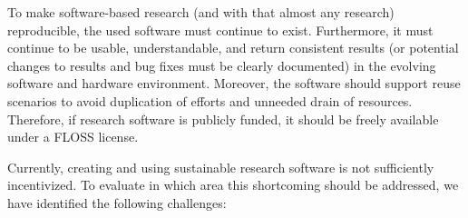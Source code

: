 \documentclass[a4paper,num-refs,numbers,sort&compress]{de-rse}
\begin{document}
To make software-based research (and with that almost any research)
reproducible, the used software must continue to exist. Furthermore, it must
continue to be usable, understandable, and return
consistent results (or potential changes to results and bug fixes must be clearly documented) in the
evolving software and hardware environment. Moreover, the software
should support reuse scenarios to avoid duplication of efforts and
unneeded drain of resources. Therefore, if research software is publicly
funded, it should be freely available under a FLOSS license.

Currently, creating and using sustainable research software is not sufficiently incentivized. To evaluate in which area this shortcoming should be addressed, we have identified the following challenges: \label{sec:motivation:challenges}
\end{document}
